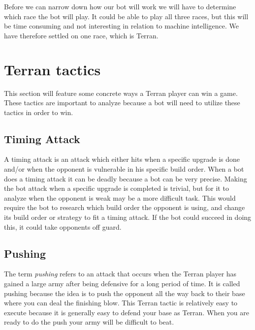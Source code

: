 Before we can narrow down how our bot will work we will have to determine which race the bot will play. It could be able to play all three races, but 
this will be time consuming and not interesting in relation to machine intelligence. We have therefore settled on one race, which is Terran.

\section{Terran tactics}
	This section will feature some concrete ways a Terran player can win a game. 
	These tactics are important to analyze because a bot will need to utilize these tactics in order to win.
	
	\subsection{Timing Attack}
		A timing attack is an attack which either hits when a specific upgrade is done and/or when the opponent is vulnerable in his specific build order. 
		When a bot does a timing attack it can be deadly because a bot can be very precise. 
		Making the bot attack when a specific upgrade is completed is trivial, but for it to 
		analyze when the opponent is weak may be a more difficult task. 
		This would require the bot to research which build order the opponent is using, and change its build order or strategy to fit a timing attack. 
		If the bot could succeed in doing this, it could take opponents off guard.
		
	\subsection{Pushing}
		The term \textit{pushing} refers to an attack that occurs when the Terran player has gained a large army after being defensive for a long 
		period of time. It is called pushing because the idea is to push the opponent 
		all the way back to their base where you can deal the finishing blow. This Terran tactic is relatively easy to execute because it is generally
		easy to defend your base as Terran. When you are ready to do the push your army will be difficult to beat.
		
